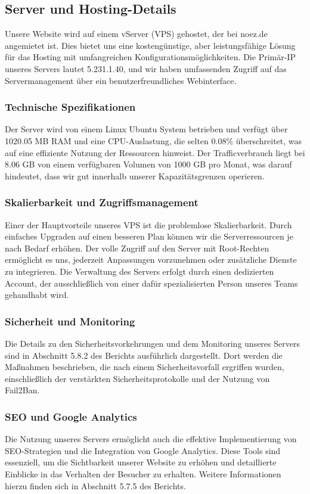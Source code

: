 \subsection{Server und Hosting-Details}
Unsere Website wird auf einem vServer (VPS) gehostet, der bei noez.de angemietet ist. Dies bietet uns eine kostengünstige, aber leistungsfähige Lösung für das Hosting mit umfangreichen Konfigurationsmöglichkeiten. Die Primär-IP unseres Servers lautet 5.231.1.40, und wir haben umfassenden Zugriff auf das Servermanagement über ein benutzerfreundliches Webinterface.

\subsubsection{Technische Spezifikationen}
Der Server wird von einem Linux Ubuntu System betrieben und verfügt über 1020.05 MB RAM und eine CPU-Auslastung, die selten 0.08\% überschreitet, was auf eine effiziente Nutzung der Ressourcen hinweist. Der Trafficverbrauch liegt bei 8.06 GB von einem verfügbaren Volumen von 1000 GB pro Monat, was darauf hindeutet, dass wir gut innerhalb unserer Kapazitätsgrenzen operieren.

\subsubsection{Skalierbarkeit und Zugriffsmanagement}
Einer der Hauptvorteile unseres VPS ist die problemlose Skalierbarkeit. Durch einfaches Upgraden auf einen besseren Plan können wir die Serverressourcen je nach Bedarf erhöhen. Der volle Zugriff auf den Server mit Root-Rechten ermöglicht es uns, jederzeit Anpassungen vorzunehmen oder zusätzliche Dienste zu integrieren. Die Verwaltung des Servers erfolgt durch einen dedizierten Account, der ausschließlich von einer dafür spezialisierten Person unseres Teams gehandhabt wird.

\subsubsection{Sicherheit und Monitoring}
Die Details zu den Sicherheitsvorkehrungen und dem Monitoring unseres Servers sind in Abschnitt 5.8.2 des Berichts ausführlich dargestellt. Dort werden die Maßnahmen beschrieben, die nach einem Sicherheitsvorfall ergriffen wurden, einschließlich der verstärkten Sicherheitsprotokolle und der Nutzung von Fail2Ban.

\subsubsection{SEO und Google Analytics}
Die Nutzung unseres Servers ermöglicht auch die effektive Implementierung von SEO-Strategien und die Integration von Google Analytics. Diese Tools sind essenziell, um die Sichtbarkeit unserer Website zu erhöhen und detaillierte Einblicke in das Verhalten der Besucher zu erhalten. Weitere Informationen hierzu finden sich in Abschnitt 5.7.5 des Berichts.

